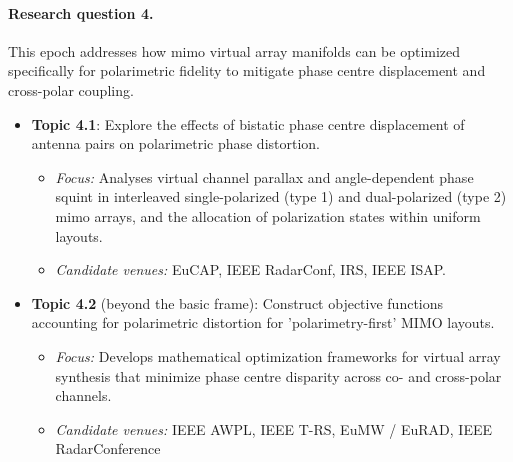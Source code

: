 \paragraph{Research question 4.}
This epoch addresses how \gls{mimo} virtual array manifolds can be optimized specifically for polarimetric fidelity to mitigate phase centre displacement and cross-polar coupling.
\begin{itemize}
    \item \textbf{Topic 4.1}: Explore the effects of bistatic phase centre displacement of antenna pairs on polarimetric phase distortion.
    \begin{itemize}
        \item \textit{Focus:} Analyses virtual channel parallax and angle-dependent phase squint in interleaved single-polarized (type 1) and dual-polarized (type 2) \gls{mimo} arrays, and the allocation of polarization states within uniform layouts.
        \item \textit{Candidate venues:} EuCAP, IEEE RadarConf, IRS, IEEE ISAP.
    \end{itemize}

    \item \textbf{Topic 4.2} (beyond the basic frame): Construct objective functions accounting for polarimetric distortion for 'polarimetry-first' MIMO layouts.
    \begin{itemize}
        \item \textit{Focus:} Develops mathematical optimization frameworks for virtual array synthesis that minimize phase centre disparity across co- and cross-polar channels.
        \item \textit{Candidate venues:} IEEE AWPL, IEEE T-RS, EuMW / EuRAD, IEEE RadarConference
    \end{itemize}
\end{itemize}

